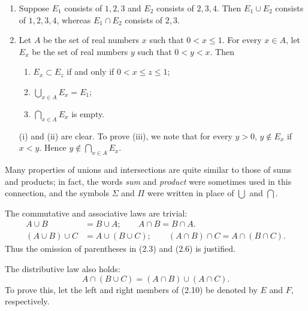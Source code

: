 \begin{enumerate}[label=(\alph*), leftmargin=2.2em, itemsep=4pt, topsep=4pt]
  \item Suppose $E_1$ consists of $1,2,3$ and $E_2$ consists of $2,3,4$. Then
        $E_1 \cup E_2$ consists of $1,2,3,4$, whereas $E_1 \cap E_2$ consists
        of $2,3$.
  \item Let $A$ be the set of real numbers $x$ such that $0 < x \le 1$. For
        every $x \in A$, let $E_x$ be the set of real numbers $y$ such that
        $0 < y < x$. Then
        \begin{enumerate}[label=(\roman*), leftmargin=2.2em, itemsep=1pt, topsep=3pt]
          \item $E_x \subset E_z$ if and only if $0 < x \le z \le 1$;
          \item $\bigcup_{x \in A} E_x = E_1$;
          \item $\bigcap_{x \in A} E_x$ is empty.
        \end{enumerate}
        (i) and (ii) are clear. To prove (iii), we note that for every $y > 0$,
        $y \notin E_x$ if $x < y$. Hence $y \notin \bigcap_{x \in A}
        E_x$.
\end{enumerate}

Many properties of unions and intersections are quite similar to those of sums
and products; in fact, the words \emph{sum} and \emph{product} were sometimes
used in this connection, and the symbols $\Sigma$ and $\Pi$ were written in
place of $\bigcup$ and $\bigcap$.

The commutative and associative laws are trivial:
\begin{align}
  A \cup B &= B \cup A; \qquad A \cap B = B \cap A. \tag{2.8}\\
  (A \cup B) \cup C &= A \cup (B \cup C); \qquad
  (A \cap B) \cap C = A \cap (B \cap C). \tag{2.9}
\end{align}
Thus the omission of parentheses in (2.3) and (2.6) is justified.

The distributive law also holds:
\begin{equation}
  A \cap (B \cup C) = (A \cap B) \cup (A \cap C). \tag{2.10}
\end{equation}
To prove this, let the left and right members of (2.10) be denoted by $E$ and
$F$, respectively.


